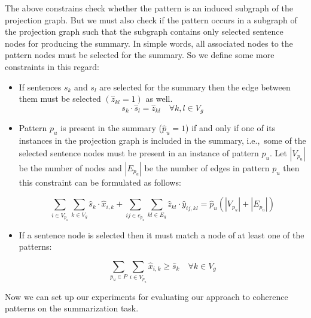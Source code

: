 The above constrains check whether the pattern is an induced subgraph of the projection graph. 
But we must also check if the pattern occurs in a subgraph of the projection graph such that the subgraph contains only selected sentence nodes for producing the summary. 
In simple words, all associated nodes to the pattern nodes must be selected for the summary. 
So we define some more constraints in this regard:

\begin{itemize}

\item If sentences $s_{k}$ and $s_{l}$ are selected for the summary then the edge between them must be selected $(\hat{z}_{kl}=1)$ as well.
\begin{equation}
	\label{eq:quadretic-const}
 s_{k} \cdot \hat{s}_{l}=\hat{z}_{kl} \quad \forall k,l \in V_{g}
\end{equation}

\item Pattern $p_u$ is present in the summary ($\hat{p}_u=1$) if and only if one of its instances in the projection graph is included in the summary, i.e.,\ some of the selected sentence nodes must be present in an instance of pattern $p_{u}$.
Let $|V_{p_{u}}|$ be the number of nodes and $|E_{p_u}|$ be the number of edges in pattern $p_{u}$ then this constraint can be formulated as follows:

\begin{equation}
\underset{i \in V_{p_u}}{\sum} \underset{k \in V_g}{\sum} \hat{s}_k \cdot \hat{x}_{i,k}+\underset{ij \in e_{p_u}}{\sum} \underset{kl \in E_g}{\sum} \hat{z}_{kl} \cdot \hat{y}_{ij,kl} = \hat{p}_{u}(|V_{p_u}|+|E_{p_u}|)
\end{equation}

\item If a sentence node is selected then it must match a node of at least one of the patterns:

\begin{equation}
\sum_{p_{u} \in P} \sum_{i \in V_{p_{u}}} \hat{x}_{i,k} \geq \hat{s}_{k} \quad \forall k \in V_{g}
 \end{equation}
\end{itemize}

Now we can set up our experiments for evaluating our approach to coherence patterns on the summarization task. 

